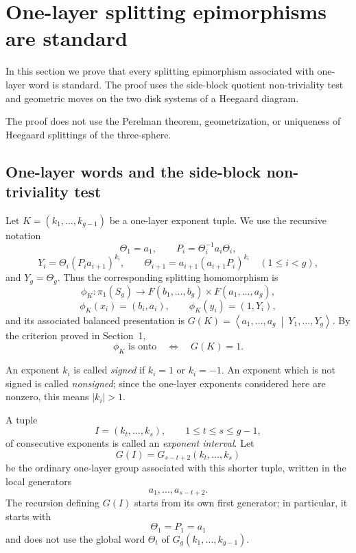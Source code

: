 \documentclass{article}
\begin{document}
\section{One-layer splitting epimorphisms are standard}
\label{Se:stand}

In this section we prove that every splitting epimorphism associated with 
 one-layer word is standard.  The proof uses the side-block quotient non-triviality
test and geometric moves on the two disk systems of a Heegaard diagram.


The proof does not use the Perelman theorem, geometrization,
or uniqueness of Heegaard splittings of the three-sphere.

\subsection{One-layer words and the side-block non-triviality test}

Let
\(
 K=(k_1,\ldots,k_{g-1})
\)
be a one-layer exponent tuple.  We use the recursive notation
\[
 \Theta_1=a_1,
 \qquad
 P_i=\Theta_i^{-1}a_i\Theta_i,
\]
\[
 Y_i=\Theta_i(P_i a_{i+1})^{k_i},
 \qquad
 \Theta_{i+1}=a_{i+1}(a_{i+1}P_i)^{k_i}
 \quad (1\leq i<g),
\]
and
\(
 Y_g=\Theta_g.
\)
Thus the corresponding splitting homomorphism is
\[
 \phi_K:\pi_1(S_g)\longrightarrow
 F(b_1,\ldots,b_g)\times F(a_1,\ldots,a_g),
\]
\[
 \phi_K(x_i)=(b_i,a_i),
 \qquad
 \phi_K(y_i)=(1,Y_i),
\]
and its associated balanced presentation is
\(
 G(K)=\left\langle a_1,\ldots,a_g\ \middle|\
 Y_1,\ldots,Y_g\right\rangle.
\)
By the criterion proved in Section~1,
\begin{equation}
 \phi_K\text{ is onto}
 \quad\Longleftrightarrow\quad
 G(K)=1.
 \label{eq:one-layer-onto-trivial}
\end{equation}

\medskip
\noindent
An exponent $k_i$ is called \emph{signed} if $k_i=1$ or $k_i=-1$.
An exponent which is not signed is called \emph{nonsigned}; since the
one-layer exponents considered here are nonzero, this means $|k_i|>1$.

\medskip
\noindent
A tuple
\[
 I=(k_t,\ldots,k_s),
 \qquad 1\leq t\leq s\leq g-1,
\]
of consecutive exponents is called an \emph{exponent interval}.
Let
\[
 G(I)=G_{s-t+2}(k_t,\ldots,k_s)
\]
be the ordinary one-layer group associated with this shorter tuple, written
in the local generators
\[
 a_1,\ldots,a_{s-t+2}.
\]
The recursion defining $G(I)$ starts from its own first generator; in
particular, it starts with
\[
 \Theta_1=P_1=a_1
\]
and does not use the global word $\Theta_t$ of
$G_g(k_1,\ldots,k_{g-1})$.
\end{document}
